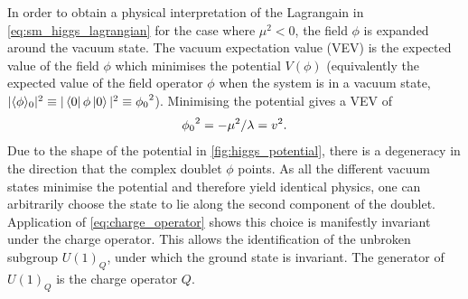 %
In order to obtain a physical interpretation of the Lagrangain in \cref{eq:sm_higgs_lagrangian} for the case where $\mu^2 < 0$, the field $\phi$ is expanded around the vacuum state.
The vacuum expectation value (VEV) is the expected value of the field $\phi$ which minimises the potential $V(\phi)$ (equivalently the expected value of the field operator $\phi$ when the system is in a vacuum state, $|\langle{\phi}\rangle_0|^2 \equiv |\left\langle 0 \right| \phi \left| 0 \right\rangle|^2 \equiv {\phi_0}^2$).
Minimising the potential gives a VEV of
%
\begin{equation}\label{eq:higgs_vev}
  {\phi_0}^2 = -\mu^2 / \lambda = v^2 .
\end{equation}
%
Due to the shape of the potential in \cref{fig:higgs_potential}, there is a degeneracy in the direction that the complex doublet $\phi$ points.
As all the different vacuum states minimise the potential and therefore yield identical physics, one can arbitrarily choose the state to lie along the second component of the doublet.
Application of \cref{eq:charge_operator} shows this choice is manifestly invariant under the charge operator.
This allows the identification of the unbroken subgroup $U(1)_Q$, under which the ground state is invariant.
The generator of $U(1)_Q$ is the charge operator $Q$.





